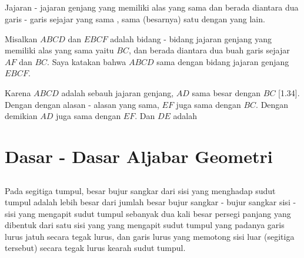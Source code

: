 \documentclass[a4paper]{book}
\begin{document}
\section*{\centering \thesection}
Jajaran - jajaran genjang yang memiliki alas yang sama dan berada diantara dua
garis - garis sejajar yang sama , sama (besarnya) satu dengan yang lain.  

Misalkan $ABCD$ dan $EBCF$ adalah bidang - bidang jajaran genjang yang memiliki alas yang sama yaitu $BC$, 
dan berada diantara dua buah garis sejajar $AF$ dan $BC$. Saya katakan bahwa $ABCD$ sama dengan bidang
jajaran genjang $EBCF$.

Karena $ABCD$ adalah sebauh jajaran genjang, $AD$ sama besar dengan $BC$ [1.34]. Dengan dengan alasan - alasan
yang sama, $EF$ juga sama dengan $BC$. Dengan demikian $AD$ juga sama dengan $EF$. Dan $DE$ adalah 

\setcounter{chapter}{2}
\chapter*{\centering \chaptername{ \thechapter} 
Dasar - Dasar Aljabar Geometri}
\setcounter{section}{12}
\section*{\centering \thesection} 

Pada segitiga tumpul, besar bujur sangkar dari sisi yang menghadap sudut tumpul
 adalah lebih besar dari jumlah besar bujur sangkar - bujur sangkar sisi - sisi yang 
mengapit sudut tumpul sebanyak dua kali besar persegi panjang yang dibentuk
dari satu sisi yang yang mengapit sudut tumpul yang padanya garis lurus jatuh
secara tegak lurus, dan garis lurus yang memotong sisi luar (segitiga tersebut) secara tegak lurus 
kearah sudut tumpul.

\end{document}
